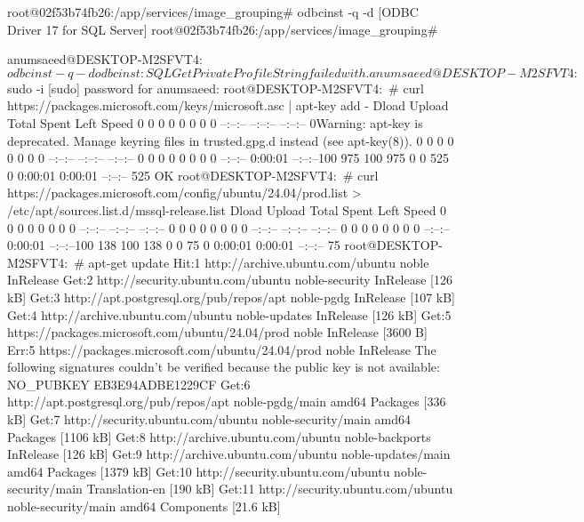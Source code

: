 root@02f53b74fb26:/app/services/image_grouping# odbcinst -q -d
[ODBC Driver 17 for SQL Server]
root@02f53b74fb26:/app/services/image_grouping#

anumsaeed@DESKTOP-M2SFVT4:~$ odbcinst -q -d
odbcinst: SQLGetPrivateProfileString failed with .
anumsaeed@DESKTOP-M2SFVT4:~$ sudo -i
[sudo] password for anumsaeed:
root@DESKTOP-M2SFVT4:~# curl https://packages.microsoft.com/keys/microsoft.asc | apt-key add -
                                 Dload  Upload   Total   Spent    Left  Speed
  0     0    0     0    0     0      0      0 --:--:-- --:--:-- --:--:--     0Warning: apt-key is deprecated. Manage keyring files in trusted.gpg.d instead (see apt-key(8)).
  0     0    0     0    0     0      0      0 --:--:-- --:--:-- --:--:--  0     0    0     0    0     0      0      0 --:--:--  0:00:01 --:--:--100   975  100   975    0     0    525      0  0:00:01  0:00:01 --:--:--   525
OK
root@DESKTOP-M2SFVT4:~# curl https://packages.microsoft.com/config/ubuntu/24.04/prod.list > /etc/apt/sources.list.d/mssql-release.list
                                 Dload  Upload   Total   Spent    Left  Speed
  0     0    0     0    0     0      0      0 --:--:-- --:--:-- --:--:--  0     0    0     0    0     0      0      0 --:--:-- --:--:-- --:--:--  0     0    0     0    0     0      0      0 --:--:--  0:00:01 --:--:--100   138  100   138    0     0     75      0  0:00:01  0:00:01 --:--:--    75
root@DESKTOP-M2SFVT4:~# apt-get update
Hit:1 http://archive.ubuntu.com/ubuntu noble InRelease
Get:2 http://security.ubuntu.com/ubuntu noble-security InRelease [126 kB]
Get:3 http://apt.postgresql.org/pub/repos/apt noble-pgdg InRelease [107 kB]
Get:4 http://archive.ubuntu.com/ubuntu noble-updates InRelease [126 kB]
Get:5 https://packages.microsoft.com/ubuntu/24.04/prod noble InRelease [3600 B]
Err:5 https://packages.microsoft.com/ubuntu/24.04/prod noble InRelease
  The following signatures couldn't be verified because the public key is not available: NO_PUBKEY EB3E94ADBE1229CF
Get:6 http://apt.postgresql.org/pub/repos/apt noble-pgdg/main amd64 Packages [336 kB]
Get:7 http://security.ubuntu.com/ubuntu noble-security/main amd64 Packages [1106 kB]
Get:8 http://archive.ubuntu.com/ubuntu noble-backports InRelease [126 kB]
Get:9 http://archive.ubuntu.com/ubuntu noble-updates/main amd64 Packages [1379 kB]
Get:10 http://security.ubuntu.com/ubuntu noble-security/main Translation-en [190 kB]
Get:11 http://security.ubuntu.com/ubuntu noble-security/main amd64 Components [21.6 kB]

